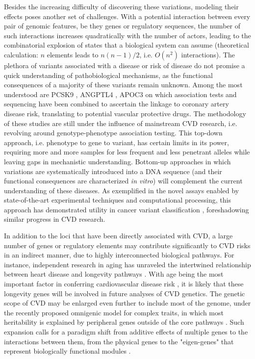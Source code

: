 \documentclass[letter]{bioinfo}
\begin{document}
Besides the increasing difficulty of discovering these variations, modeling their effects poses another set of challenges. With a potential interaction between every pair of genomic features, be they genes or regulatory sequences, the number of such interactions increases quadratically with the number of actors, leading to the combinatorial explosion of states that a biological system can assume (theoretical calculation: $n$ elements leads to $n(n-1)/2$, i.e. $O(n^2)$ interactions).  The plethora of variants associated with a disease or risk of disease do not promise a quick understanding of pathobiological mechanisms, as the functional consequences of a majority of these variants remain unknown. Among the most understood are PCSK9 \citep{Cohen:2006:Sequence}, ANGPTL4 \citep{Dewey:2016:Inactivating,CARDIoGRAM:2016:Coding}, APOC3 \citep{NHLBI:2014:LossofFunction} on which association tests and sequencing have been combined to ascertain the linkage to coronary artery disease risk, translating to potential vascular protective drugs. The methodology of these studies are still under the influence of mainstream CVD research, i.e. revolving around genotype-phenotype association testing. This top-down approach, i.e. phenotype to gene to variant, has certain limits in its power, requiring more and more samples for less frequent and less penetrant alleles while leaving gaps in mechanistic understanding. Bottom-up approaches in which variations are systematically introduced into a DNA sequence (and their functional consequences are characterized \textit{in vitro}) will complement the current understanding of these diseases. As exemplified in the novel assays enabled by state-of-the-art experimental techniques and computational processing, this approach has demonstrated utility in cancer variant classification \citep{Findlay:2018:Accurate}, foreshadowing similar progress in CVD research.

In addition to the loci that have been directly associated with CVD, a large number of genes or regulatory elements may contribute significantly to CVD risks in an indirect manner, due to highly interconnected biological pathways.  For instance, independent research in aging has unraveled the intertwined relationship between heart disease and longevity pathways \citep{North:2012:Intersection}.  With age being the most important factor in conferring cardiovascular disease risk \citep{Steenman:2017:Cardiac}, it is likely that these longevity genes will be involved in future analyses of CVD genetics. The genetic scope of CVD may be enlarged even further to include most of the genome, under the recently proposed omnigenic model for complex traits, in which most heritability is explained by peripheral genes outside of the core pathways \citep{Boyle:2017:Expanded}. Such expansion calls for a paradigm shift from additive effects of multiple genes to the interactions between them, from the physical genes to the "eigen-genes" that represent biologically functional modules \citep{Weiss:2012:Good}.
	
\end{document}
